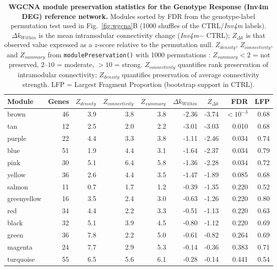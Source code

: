 \documentclass[9pt,twocolumn,twoside]{rilabRxiv}
\newcommand{\invfour}{\textit{Inv4m}\xspace}
\begin{document}
\begin{table}[!ht]
\caption{\textbf{WGCNA module preservation statistics for the Genotype Response (Inv4m DEG) reference network.} Modules sorted by FDR from the genotype-label permutation test used in Fig.~\ref{fig:wgcna}B (1000 shuffles of the CTRL/\invfour labels). $\Delta k_{Within}$ is the mean intramodular connectivity change (\invfour $-$ CTRL); $Z_{\Delta k}$ is that observed value expressed as a $z$-score relative to the permutation null. $Z_{density}$, $Z_{connectivity}$, and $Z_{summary}$ from \texttt{modulePreservation()} with 1000 permutations \cite{langfelder2011}: $Z_{summary} < 2$ = not preserved, $2$--$10$ = moderate, $> 10$ = strong. $Z_{connectivity}$ quantifies rank preservation of intramodular connectivity; $Z_{density}$ quantifies preservation of average connectivity strength. LFP = Largest Fragment Proportion (bootstrap support in CTRL).}
\label{tab::preservation}
\centering
\small
\begin{tabular}{@{}lrrrrrrrr@{}}
\toprule
\textbf{Module} & \textbf{Genes} & \textbf{$Z_{density}$} & \textbf{$Z_{connectivity}$} & \textbf{$Z_{summary}$} & \textbf{$\Delta k_{Within}$} & \textbf{$Z_{\Delta k}$} & \textbf{FDR} & \textbf{LFP} \\
\midrule
brown & 46 & 3.9 & 3.8 & 3.8 & -2.36 & -3.74 & $< 10^{-3}$ & 0.68 \\
tan & 12 & 2.5 & 2.0 & 2.2 & -3.01 & -3.03 & 0.010 & 0.68 \\
purple & 22 & 4.4 & 3.3 & 3.8 & -1.11 & -2.46 & 0.034 & 0.74 \\
blue & 51 & 1.9 & 4.4 & 3.1 & -1.64 & -2.37 & 0.034 & 0.79 \\
pink & 30 & 5.1 & 6.4 & 5.8 & -1.36 & -2.28 & 0.034 & 0.72 \\
yellow & 36 & 2.6 & 4.4 & 3.5 & -1.47 & -1.89 & 0.085 & 0.68 \\
salmon & 11 & 0.7 & 1.7 & 1.2 & -0.39 & -1.35 & 0.220 & 0.52 \\
greenyellow & 16 & 3.5 & 2.4 & 3.0 & -0.63 & -1.26 & 0.220 & 0.80 \\
red & 34 & 4.4 & 2.2 & 3.3 & -0.51 & -1.13 & 0.220 & 0.63 \\
black & 32 & 5.1 & 3.9 & 4.5 & -0.80 & -1.12 & 0.220 & 0.69 \\
green & 36 & 7.8 & 2.2 & 5.0 & -0.61 & -0.82 & 0.264 & 0.69 \\
magenta & 24 & 7.7 & 2.9 & 5.3 & -0.14 & -0.36 & 0.383 & 0.71 \\
turquoise & 55 & 6.5 & 5.6 & 6.1 & -0.28 & -0.14 & 0.441 & 0.54 \\
\bottomrule
\end{tabular}
\end{table}
\end{document}
